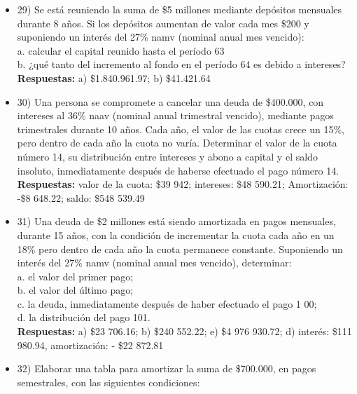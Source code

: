 \begin{itemize}
	\item 29)	 Se está reuniendo la suma de \$5 millones mediante depósitos mensuales durante 8 años. Si los depósitos aumentan de valor cada mes \$200 y suponiendo un interés del 27\% namv (nominal anual mes vencido):\\
	
	a.	calcular el capital reunido hasta el período 63 \\
	b.	¿qué tanto del incremento al fondo en el período 64 es debido a intereses? \\
	\textbf{Respuestas: }a) \$1.840.961.97;  b) \$41.421.64
	\medskip
	
	\item 30)	 Una persona se compromete a cancelar una deuda de \$400.000, con intereses al 36\% naav (nominal anual trimestral vencido), mediante pagos trimestrales durante 10 años. Cada año, el valor de las cuotas crece un 15\%, pero dentro de cada año la cuota no varía. Determinar el valor de la cuota número 14, su distribución entre intereses y abono a capital y el saldo insoluto, inmediatamente después de haberse efectuado el pago número 14.\\
	\textbf{Respuestas:} valor de la cuota: \$39 942; 	intereses: \$48 590.21;
	Amortización: -\$8 648.22;       saldo: \$548 539.49\\
	\medskip
	\item 31)	 Una deuda de \$2 millones está siendo amortizada en pagos mensuales, durante 15 años, con la condición de incrementar la cuota cada año en un 18\% pero dentro de cada año la cuota permanece constante. Suponiendo un interés del 27\% namv (nominal anual mes vencido), determinar:\\
	
	a.	el valor del primer pago; \\
	b.	el valor del último pago; \\
	c.	 la deuda, inmediatamente después de haber efectuado el pago 1 00; \\
	d.	la distribución del pago 101. \\
	\textbf{Respuestas: }a) \$23 706.16;	 b) \$240 552.22; 	e) \$4 976 930.72; 
	d) interés: \$111 980.94, amortización: - \$22 872.81
	\medskip
	
	\item 32)	 Elaborar una tabla para amortizar la suma de \$700.000, en pagos semestrales, con las siguientes condiciones:\\
	

\end{itemize}
